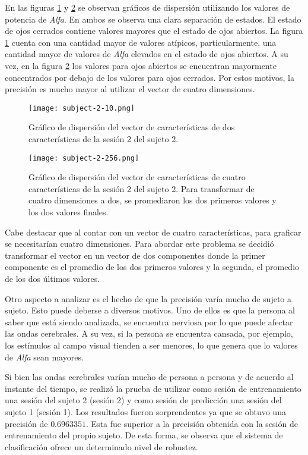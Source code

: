 En las figuras \ref{fig:subject-2-10} y \ref{fig:subject-2-256} se observan gráficos de dispersión utilizando los valores de potencia de \emph{Alfa}. En ambos se observa una clara separación de estados. El estado de ojos cerrados contiene valores mayores que el estado de ojos abiertos. La figura \ref{fig:subject-2-10}  cuenta con una cantidad mayor de valores atípicos, particularmente, una cantidad mayor de valores de \emph{Alfa} elevados en el estado de ojos abiertos. A su vez, en la figura \ref{fig:subject-2-256} los valores para ojos abiertos se encuentran mayormente concentrados por debajo de los valores para ojos cerrados. Por estos motivos, la precisión es mucho mayor al utilizar el vector de cuatro dimensiones.

 \begin{figure}[H]
	\centering
    \texttt{[image: subject-2-10.png]}
    \caption{Gráfico de dispersión del vector de características de dos características de la sesión  2 del sujeto 2.}
	\label{fig:subject-2-10}
\end{figure}

 \begin{figure}[H]
	\centering
    \texttt{[image: subject-2-256.png]}
    \caption{Gráfico de dispersión del vector de características de cuatro características de la sesión  2 del sujeto 2. Para transformar de cuatro dimensiones a dos, se promediaron los dos primeros valores y los dos valores finales.}
	\label{fig:subject-2-256}
\end{figure}

Cabe destacar que al contar con un vector de cuatro características, para graficar se necesitarían cuatro dimensiones. Para abordar este problema se decidió transformar el vector en un vector de dos componentes donde la primer componente es el promedio de los dos primeros valores y la segunda, el promedio de los dos últimos valores.

Otro aspecto a analizar es el hecho de que la precisión varía mucho de sujeto a sujeto. Esto puede deberse a diversos motivos. Uno de ellos es que la persona al saber que está siendo analizada, se encuentra nerviosa por lo que puede afectar las ondas cerebrales. A su vez, si la persona se encuentra cansada, por ejemplo, los estímulos al campo visual tienden a ser menores, lo que genera que lo valores de \emph{Alfa} sean mayores.

Si bien las ondas cerebrales varían mucho de persona a persona y de acuerdo al instante del tiempo, se realizó la prueba de utilizar como sesión de entrenamiento una sesión del sujeto 2 (sesión 2) y como sesión de predicción una sesión del sujeto 1 (sesión 1). Los resultados fueron sorprendentes ya que se obtuvo una precisión de $0.6963351$. Esta fue superior a la precisión obtenida con la sesión de entrenamiento del propio sujeto. De esta forma, se observa que el sistema de clasificación ofrece un determinado nivel de robustez.
